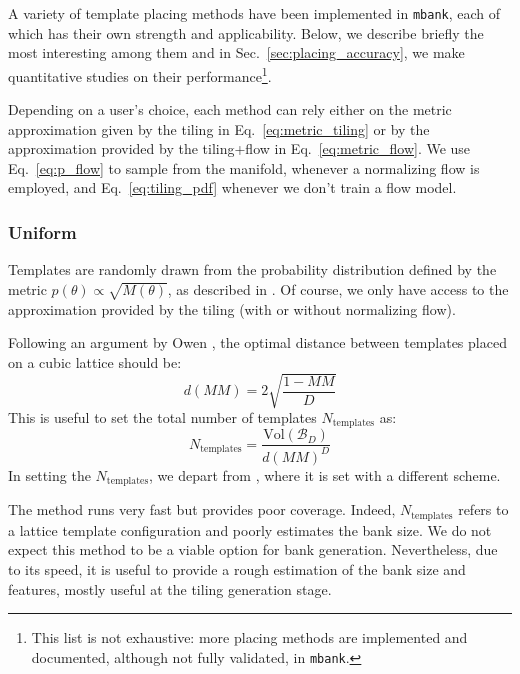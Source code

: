 \documentclass[twocolumn,showpacs,preprintnumbers,nofootinbib,prd,
superscriptaddress,10pt]{revtex4-2}
\begin{document}
A variety of template placing methods have been implemented in \texttt{mbank}, each of which has their own strength and applicability.
Below, we describe briefly the most interesting among them and in Sec.~\ref{sec:placing_accuracy}, we make quantitative studies on their performance\footnote{
This list is not exhaustive: more placing methods are implemented and documented, although not fully validated, in \texttt{mbank}.}.

Depending on a user's choice, each method can rely either on the metric approximation given by the tiling in Eq.~\eqref{eq:metric_tiling} or by the approximation provided by the tiling+flow in Eq.~\eqref{eq:metric_flow}.
We use Eq.~\eqref{eq:p_flow} to sample from the manifold, whenever a normalizing flow is employed, and Eq.~\eqref{eq:tiling_pdf} whenever we don't train a flow model.

\subsubsection{Uniform}\label{par:uniform}
Templates are randomly drawn from the probability distribution defined by the metric $p(\theta) \propto \sqrt{M(\theta)}$, as described in \cite{Messenger:2008ta}.
Of course, we only have access to the approximation provided by the tiling (with or without normalizing flow).

Following an argument by Owen \cite{owen_metric}, the optimal distance between templates placed on a cubic lattice should be:
\begin{equation}
	d(MM) = 2 \sqrt{\frac{1-MM}{D}}
\end{equation}
This is useful to set the total number of templates $N_\mathrm{templates}$ as:
\begin{equation} \label{eq:N_templates}
	N_{\text{templates}} = \frac{\text{Vol}(\mathcal{B}_D)}{d(MM)^D}
\end{equation}
In setting the $N_{\text{templates}}$, we depart from \cite{Messenger:2008ta}, where it is set with a different scheme.

The method runs very fast but provides poor coverage. Indeed, $N_{\text{templates}}$ refers to a lattice template configuration and poorly estimates the bank size. We do not expect this method to be a viable option for bank generation.
Nevertheless, due to its speed, it is useful to provide a rough estimation of the bank size and features, mostly useful at the tiling generation stage.
\end{document}
